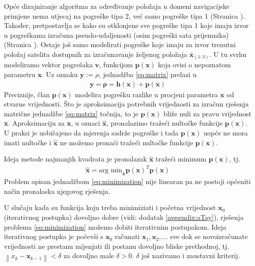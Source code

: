 \documentclass[a4paper,twoside,12pt]{memoir} %
\begin{document}
Opće dizajniranje algoritma za određivanje položaja u domeni navigacijske primjene nema utjecaj na
pogreške tipa 2,
već samo pogreške tipa 1 (Stranica \pageref{stranica:greskaOvisisamoOxOpravdano}).
Također, pretpostavlja se kako su otklonjene sve pogreške tipa 1 koje imaju izvor 
u pogreškama izračuna pseudo-udaljenosti (osim pogreški sata prijemnika) (Stranica \pageref{stranica:greskaOvisisamoOxOpravdano}).
Ostaje još samo modelirati pogreške koje imaju za izvor trenutni položaj satelita dostupnih za
izračunavanje željenog položaja $\bar{\mathbf{x}}_{(1:3)}$.
U tu svrhu modeliramo vektor pogrešaka $\mathbf{v}$, funkcijom $\mathbf{p}(\mathbf{x})$ koja ovisi o nepoznatom parametru $\mathbf{x}$.
Uz oznaku $\mathbf{y} := \rho$, 
 jednadžba  \ref{eq:matrix} prelazi u
\begin{align}\label{eq:matrix2}
\mathbf{y} = \mathbf{\rho} = \mathbf{h}(\mathbf{x})+ \mathbf{p}(\mathbf{x})
\end{align}%
Preciznije,
član $\mathbf{p}(\mathbf{x})$ modelira pogrešku razlike u procjeni parametra $\mathbf{x}$ od stvarne vrijednosti.
Što je aproksimacija potrebnih vrijednosti za izračun rješenja matrične jednadžbe
\ref{eq:matrix} točnija, to je $\mathbf{p}(\mathbf{x})$ 
bliže nuli za pravu vrijednost $\bar{\mathbf{x}}$.
Aproksimaciju za $\bar{\mathbf{x}}$, u oznaci $\hat{\mathbf{x}}$, pronalazimo tražeći nultočke funkcije $\mathbf{p}(\mathbf{x})$.
U praksi je uobičajeno da mjerenja sadrže pogreške i tada $\mathbf{p}(\mathbf{x})$ uopće ne mora imati 
nultočke i $\hat{\mathbf{x}}$ ne možemo pronaći tražeći nultočke funkcije $\mathbf{p}(\mathbf{x})$.

Ideja metode najmanjih kvadrata je pronalazak $\hat{\mathbf{x}}$ tražeći minimum $\mathbf{p}(\mathbf{x})$, tj.
\begin{align}\label{eq:minimization}
	\hat{\mathbf{x}} = \text{arg min}_\mathbf{x} \mathbf{p}(\mathbf{x})^T\mathbf{p}(\mathbf{x})
\end{align}
Problem opisan jednadžbom \ref{eq:minimization} nije linearan pa
ne postoji općeniti način pronalaska njegovog rješenja.

U slučaju kada su funkcija koju treba minimiziati i početna vrijednost $\mathbf{x}_0$
(iterativnog postupka) dovoljno dobre (vidi: dodatak \ref{appendix:aTay}), rješenja problema \ref{eq:minimization} možemo
dobiti iterativnim postupakom.
Ideja iterativnog postupka je počevši s $\mathbf{x}_0$ računati $\mathbf{x}_1, \mathbf{x}_2, \hdots $ sve dok se novoizračunate vrijednosti ne prestanu mijenjati ili postanu dovoljno bliske prethodnoj, tj.
$\left \| x_{k} - \mathbf{x}_{k-1}\right\| < \delta$ za dovoljno male $\delta > 0$.
$\delta$ još nazivamo i zaustavni kriterij.
\end{document}
